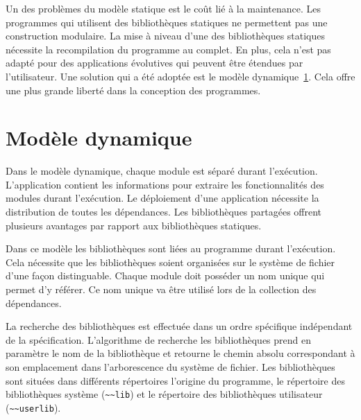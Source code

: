 
Un des problèmes du modèle statique est le coût lié à la maintenance.  Les
programmes qui utilisent des bibliothèques statiques ne permettent pas une
construction modulaire. La mise à niveau d'une des bibliothèques statiques
nécessite la recompilation du programme au complet. En plus, cela n'est pas
adapté pour des applications évolutives qui peuvent être étendues
par l'utilisateur. Une solution qui a été adoptée est le
modèle dynamique~\ref{sec:ch4_model_dynamic}. Cela offre une plus grande
liberté dans la conception des programmes.


\section{Modèle dynamique}
\label{sec:ch4_model_dynamic}

Dans le modèle dynamique, chaque module est séparé durant l'exécution.
L'application contient les informations pour extraire les fonctionnalités des
modules durant l'exécution. Le déploiement d'une application nécessite la
distribution de toutes les dépendances.  Les bibliothèques partagées offrent
plusieurs avantages par rapport aux bibliothèques statiques.

Dans ce modèle les bibliothèques sont liées au programme durant l'exécution. Cela
nécessite que les bibliothèques soient organisées sur le système de fichier d'une façon
distinguable. Chaque module doit posséder un nom unique qui permet d'y référer.
Ce nom unique va être utilisé lors de la collection des dépendances.




La recherche des bibliothèques est effectuée dans un ordre spécifique
indépendant de la spécification.  L'algorithme de recherche les bibliothèques
prend en paramètre le nom de la bibliothèque et retourne le chemin absolu
correspondant à son emplacement dans l'arborescence du système de fichier. Les
bibliothèques sont situées dans différents répertoires l'origine du programme,
le répertoire des bibliothèques système (\lstinline{~~lib}) et le
répertoire des bibliothèques utilisateur (\lstinline{~~userlib}).


